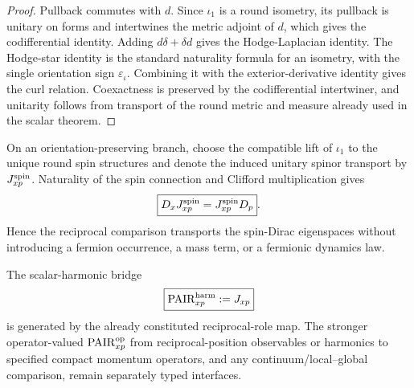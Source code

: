 \documentclass[12pt,a4paper]{article}
\begin{document}
\begin{proof}
Pullback commutes with \(d\).  Since \(\iota_1\) is a round isometry, its
pullback is unitary on forms and intertwines the metric adjoint of \(d\),
which gives the codifferential identity.  Adding \(d\delta+\delta d\) gives
the Hodge-Laplacian identity.  The Hodge-star identity is the standard
naturality formula for an isometry, with the single orientation sign
\(\varepsilon_{\iota}\).  Combining it with the exterior-derivative identity
gives the curl relation.  Coexactness is preserved by the codifferential
intertwiner, and unitarity follows from transport of the round metric and
measure already used in the scalar theorem.
\end{proof}

\begin{corollary}
\label{p2c:cor:v244-reciprocal-spin-dirac-transport}
On an orientation-preserving branch, choose the compatible lift of
\(\iota_1\) to the unique round spin structures and denote the induced
unitary spinor transport by \(J_{xp}^{\rm spin}\).  Naturality of the spin
connection and Clifford multiplication gives
\[
 \boxed{D_xJ_{xp}^{\rm spin}=J_{xp}^{\rm spin}D_p}.
\]
Hence the reciprocal comparison transports the spin-Dirac eigenspaces without
introducing a fermion occurrence, a mass term, or a fermionic dynamics law.
\end{corollary}

\begin{corollary}
\label{p2c:cor:harmonic-pairxp-generated}
The scalar-harmonic bridge
\[
 \boxed{\mathrm{PAIR}_{xp}^{\rm harm}:=J_{xp}}
\]
is generated by the already constituted reciprocal-role map.  The stronger
operator-valued $\mathrm{PAIR}_{xp}^{\rm op}$ from reciprocal-position
observables or harmonics to specified compact momentum operators, and any
continuum/local--global comparison, remain separately typed interfaces.
\end{corollary}
\end{document}
